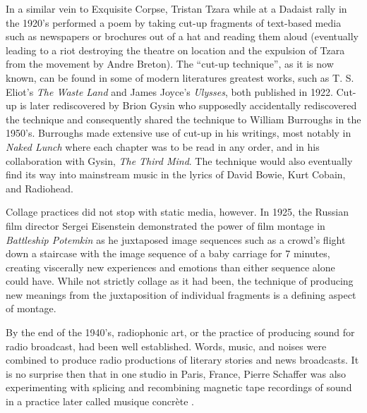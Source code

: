 \documentclass[a4paper,11pt,final]{ThesisStyle}
\begin{document}
In a similar vein to Exquisite Corpse, Tristan Tzara while at a Dadaist rally in the 1920's performed a poem by taking cut-up fragments of text-based media such as newspapers or brochures out of a hat and reading them aloud (eventually leading to a riot destroying the theatre on location and the expulsion of Tzara from the movement by Andre Breton).  The ``cut-up technique'', as it is now known, can be found in some of modern literatures greatest works, such as T. S. Eliot's \textit{The Waste Land} and James Joyce's \textit{Ulysses}, both published in 1922.  Cut-up is later rediscovered by Brion Gysin who supposedly accidentally rediscovered the technique and consequently shared the technique to William Burroughs in the 1950's.  Burroughs made extensive use of cut-up in his writings, most notably in \textit{Naked Lunch} where each chapter was to be read in any order, and in his collaboration with Gysin, \textit{The Third Mind}.  The technique would also eventually find its way into mainstream music in the lyrics of David Bowie, Kurt Cobain, and Radiohead.  %

Collage practices did not stop with static media, however.  In 1925, the Russian film director Sergei Eisenstein demonstrated the power of film montage in \textit{Battleship Potemkin} as he juxtaposed image sequences such as a crowd's flight down a staircase with the image sequence of a baby carriage for 7 minutes, creating viscerally new experiences and emotions than either sequence alone could have.  While not strictly collage as it had been, the technique of producing new meanings from the juxtaposition of individual fragments is a defining aspect of montage.

By the end of the 1940's, radiophonic art, or the practice of producing sound for radio broadcast, had been well established.  Words, music, and noises were combined to produce radio productions of literary stories and news broadcasts.  It is no surprise then that in one studio in Paris, France, Pierre Schaffer was also experimenting with splicing and recombining magnetic tape recordings of sound in a practice later called musique concr\`ete \cite{}.   %
\end{document}
